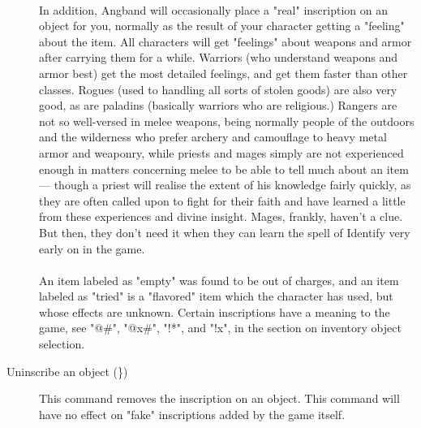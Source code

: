 \begin{description}
\paragraph{}
In addition, Angband will occasionally place a "real" inscription on an
object for you, normally as the result of your character getting a
"feeling" about the item. All characters will get "feelings" about weapons
and armor after carrying them for a while.  Warriors (who understand
weapons and armor best) get the most detailed feelings, and get them
faster than other classes. Rogues (used to handling all sorts of stolen
goods) are also very good, as are paladins (basically warriors who are
religious.) Rangers are not so well-versed in melee weapons, being
normally people of the outdoors and the wilderness who prefer archery and
camouflage to heavy metal armor and weaponry, while priests and mages
simply are not experienced enough in matters concerning melee to be able
to tell much about an item --- though a priest will realise the extent of
his knowledge fairly quickly, as they are often called upon to fight for
their faith and have learned a little from these experiences and divine
insight.  Mages, frankly, haven't a clue. But then, they don't need it
when they can learn the spell of Identify very early on in the game.

\paragraph{}
An item labeled as "{empty}" was found to be out of charges,
and an item labeled as "{tried}" is a "flavored" item which the
character has used, but whose effects are unknown. Certain inscriptions
have a meaning to the game, see "@\#", "@x\#", "!*", and "!x", in the
section on inventory object selection.

\item[Uninscribe an object (\})]
  This command removes the inscription on an object. This command will
  have no effect on "fake" inscriptions added by the game itself.
\end{description}

